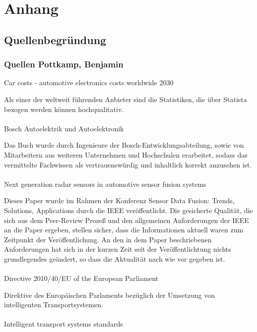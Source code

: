 \section{Anhang}
\subsection{Quellenbegründung}

\subsubsection{Quellen Pottkamp, Benjamin}

Car costs - automotive electronics costs worldwide 2030 \cite{BP02}

Als einer der weltweit führenden Anbieter sind die Statistiken, die über Statista bezogen werden können hochqualitativ.\\\\

Bosch Autoelektrik und Autoelektronik \cite{reif2011bosch}

Das Buch wurde durch Ingenieure der Bosch-Entwicklungsabteilung, sowie von Mitarbeitern aus weiteren Unternehmen und Hochschulen erarbeitet, sodass das vermittelte Fachwissen als vertrauenswürdig und inhaltlich korrekt anzusehen ist.\\\\

Next generation radar sensors in automotive sensor fusion systems \cite{BP06}

Dieses Paper wurde im Rahmen der Konferenz Sensor Data Fusion: Trends, Solutions, Applications durch die IEEE veröffentlicht. Die gesicherte Qualität,
die sich aus dem Peer-Review Prozeß und den allgemeinen Anforderungen der IEEE an die Paper ergeben, stellen sicher, dass die Informationen
aktuell waren zum Zeitpunkt der Veröffentlichung. An den in dem Paper beschriebenen  Anforderungen hat sich in der kurzen Zeit seit der Veröffentlichtung nichts grundlegendes
geändert, so dass die Aktualität nach wie vor gegeben ist.\\\\

Directive 2010/40/EU of the European Parliament \cite{BP04}

Direktive des Europäischen Parlaments bezüglich der Umsetzung von intelligenten Transportsystemen.\\\\

Intelligent transport systems standards \cite{BP11}

